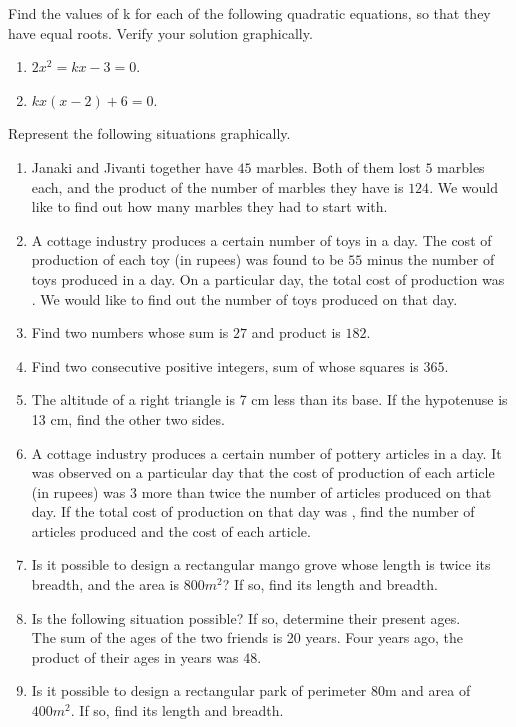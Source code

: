 Find the values of k for each of the following quadratic equations, so that they have equal roots.  Verify your solution graphically.
\begin{enumerate}[label=\thesubsection.\arabic*,ref=\thesubsection.\theenumi,resume*]
\item $2x^2=kx-3=0$.
\item $kx(x-2)+6=0$.
\end{enumerate}
Represent the following situations graphically.
\begin{enumerate}[label=\thesubsection.\arabic*,ref=\thesubsection.\theenumi,resume*]
\item Janaki and Jivanti together have $45$ marbles. Both of them lost $5$ marbles each, and the product of the number of marbles they have is $124$. We would like to find out how many marbles they had to start with.
\item A cottage industry produces a certain number of toys in a day. The cost of production of each toy (in rupees) was found to be $55$ minus the number of toys produced in a day. On a particular day, the total cost of production was . We would like to find out the number of toys produced on that day.
\item Find two numbers whose sum is $27$ and product is $182$.
\item Find two consecutive  positive integers, sum of whose squares is $365$.
\item  The altitude of a right triangle is 7 cm less than its base. If the hypotenuse is 13 cm, find the other two sides.
\item A cottage industry produces a certain number of pottery articles in a day. It was observed on a particular day that the cost of production of each article (in rupees) was $3$ more than twice the number of articles produced on that day. If the total cost of production on that day was , find the number of articles produced and the cost of each article.
\item Is it possible to design a rectangular mango grove whose length is twice its breadth, and the area is  $800m^2$? If so, find its length and breadth.
\item Is the following situation possible? If so, determine their present ages.
\\ The sum of the ages of the two friends is 20 years. Four years ago, the product of their ages in years was $48$.
\item Is it possible to design a rectangular park of perimeter 80m and area of $400m^2$. If so, find its length and breadth.

\end{enumerate}
